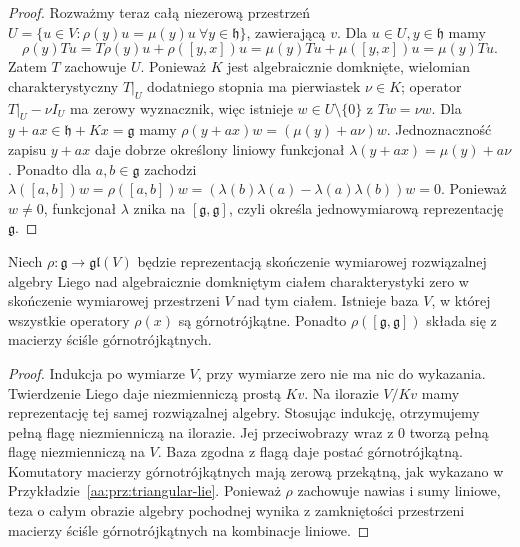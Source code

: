 \begin{proof}
Rozważmy teraz całą niezerową przestrzeń
$U=\{u\in V:\rho(y)u=\mu(y)u\ \forall y\in\mathfrak h\}$,
zawierającą $v$. Dla $u\in U,y\in\mathfrak h$
mamy
\[
 \rho(y)Tu=T\rho(y)u+\rho([y,x])u
 =\mu(y)Tu+\mu([y,x])u=\mu(y)Tu.
\]
Zatem $T$ zachowuje $U$. Ponieważ $K$ jest
algebraicznie domknięte, wielomian charakterystyczny
$T|_U$ dodatniego stopnia ma pierwiastek $\nu\in K$;
operator $T|_U-\nu I_U$ ma zerowy wyznacznik,
więc istnieje $w\in U\setminus\{0\}$ z $Tw=\nu w$.
Dla $y+ax\in\mathfrak h+Kx=\mathfrak g$ mamy
$\rho(y+ax)w=(\mu(y)+a\nu)w$.
Jednoznaczność zapisu $y+ax$ daje dobrze określony
liniowy funkcjonał $\lambda(y+ax)=\mu(y)+a\nu$.
Ponadto dla $a,b\in\mathfrak g$ zachodzi
$\lambda([a,b])w=\rho([a,b])w
=(\lambda(b)\lambda(a)-\lambda(a)\lambda(b))w=0$.
Ponieważ $w\ne0$, funkcjonał $\lambda$ znika na
$[\mathfrak g,\mathfrak g]$, czyli określa
jednowymiarową reprezentację $\mathfrak g$.
\end{proof}

\begin{wniosek}
\label{aa:cor:lie-flag}
Niech $\rho:\mathfrak g\to\mathfrak{gl}(V)$ będzie
reprezentacją skończenie wymiarowej rozwiązalnej
algebry Liego nad algebraicznie domkniętym ciałem
charakterystyki zero w skończenie wymiarowej
przestrzeni $V$ nad tym ciałem. Istnieje baza $V$,
w której wszystkie operatory
$\rho(x)$ są górnotrójkątne. Ponadto
$\rho([\mathfrak g,\mathfrak g])$ składa się
z macierzy ściśle górnotrójkątnych.
\end{wniosek}
\begin{proof}
Indukcja po wymiarze $V$, przy wymiarze zero
nie ma nic do wykazania. Twierdzenie Liego daje
niezmienniczą prostą $Kv$. Na ilorazie $V/Kv$
mamy reprezentację tej samej rozwiązalnej algebry.
Stosując indukcję, otrzymujemy pełną flagę
niezmienniczą na ilorazie. Jej przeciwobrazy
wraz z $0$ tworzą pełną flagę niezmienniczą na $V$.
Baza zgodna z flagą daje postać górnotrójkątną.
Komutatory macierzy górnotrójkątnych mają zerową
przekątną, jak wykazano w
Przykładzie~\ref{aa:prz:triangular-lie}.
Ponieważ $\rho$ zachowuje nawias i sumy liniowe,
teza o całym obrazie algebry pochodnej wynika
z zamkniętości przestrzeni macierzy ściśle
górnotrójkątnych na kombinacje liniowe.
\end{proof}

